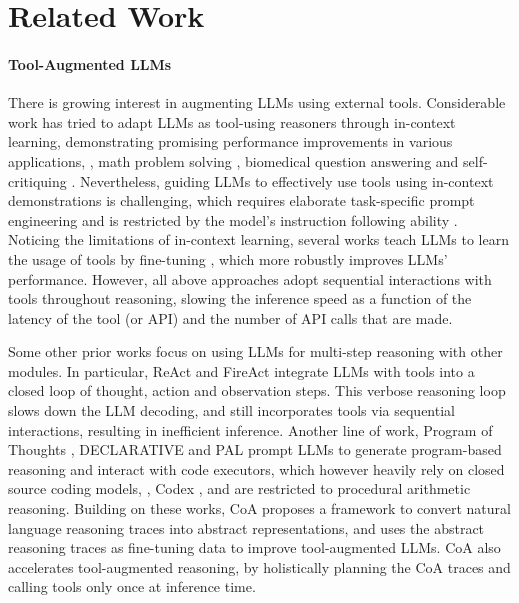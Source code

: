 \section{Related Work}

\paragraph{Tool-Augmented LLMs}
There is growing interest in augmenting LLMs using external tools.
Considerable work has tried to adapt LLMs as tool-using reasoners through in-context learning, demonstrating promising performance improvements in various applications, \eg{}, math problem solving \citep{gao2023pal,chen2022program}, biomedical question answering \citep{jin2023genegpt} and self-critiquing \citep{gou2023critic}.
Nevertheless, guiding LLMs to effectively use tools using in-context demonstrations is challenging, which requires elaborate task-specific prompt engineering and is restricted by the model's instruction following ability \citep{jacovi2023comprehensive}. Noticing the limitations of in-context learning, several works teach LLMs to learn the usage of tools by fine-tuning \citep{parisi2022talm,schick2023toolformer,hao2023toolkengpt}, which more robustly improves LLMs' performance.
However, all above approaches adopt sequential interactions with tools throughout reasoning, slowing the inference speed as a function of the latency of the tool (or API) and the number of API calls that are made.

Some other prior works focus on using LLMs for multi-step reasoning with other modules.
In particular, ReAct \citep{yao2023react} and FireAct \citep{chen2023fireact} integrate LLMs with tools into a closed loop of thought, action and observation steps.
This verbose reasoning loop slows down the LLM decoding, and still incorporates tools via sequential interactions, resulting in inefficient inference.
Another line of work, Program of Thoughts \citep{chen2022program}, DECLARATIVE \citep{he2023solving} and PAL \citep{gao2023pal} prompt LLMs to generate program-based reasoning and interact with code executors, which however heavily rely on closed source coding models, \ie{}, Codex \citep{chen2021evaluating}, and are restricted to procedural arithmetic reasoning.
Building on these works, CoA proposes a framework to convert natural language reasoning traces into abstract representations, and uses the abstract reasoning traces as fine-tuning data to improve tool-augmented LLMs.
CoA also accelerates tool-augmented reasoning, by holistically planning the CoA traces and calling tools only once at inference time.

